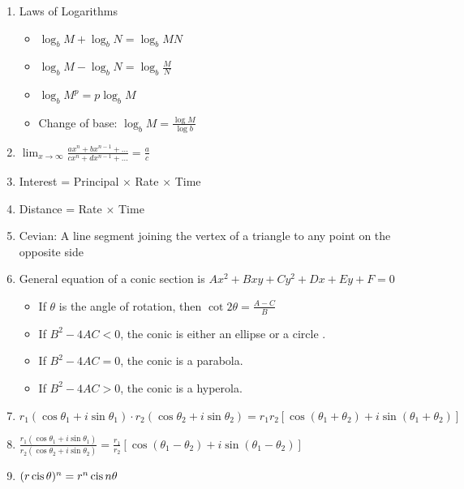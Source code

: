 \documentclass[../uilmath.tex]{subfiles}
\begin{document}
\begin{enumerate}
\begin{itemize}
    \end{itemize}
    \item Laws of Logarithms 
    \begin{itemize}
        \item $\log_b M + \log_b N = \log_b MN$
        \item $\log_b M - \log_b N = \log_b \frac{M}{N}$
        \item $\log_b M^p = p\log_b M$
        \item Change of base: $\log_b M = \frac{\log M}{\log b}$
    \end{itemize}
    \item $\lim_{x\to \infty} \frac{ax^n+bx^{n-1}+\dots}{cx^n+dx^{n-1}+\dots}=\frac{a}{c}$
    \item Interest = Principal $\times$ Rate $\times$ Time 
    \item Distance = Rate $\times$ Time 
    \item Cevian: A line segment joining the vertex of a triangle to any point on the opposite side 
    \item General equation of a conic section is $Ax^2+Bxy+Cy^2+Dx+Ey+F=0$
    \begin{itemize}
        \item If $\theta$ is the angle of rotation, then $\cot 2\theta = \frac{A-C}{B}$
        \item If $B^2-4AC<0$, the conic is either an ellipse or a circle .
        \item If $B^2-4AC=0$, the conic is a parabola.
        \item If $B^2-4AC>0$, the conic is a hyperola.
    \end{itemize}
    \item $r_1(\cos\theta_1 + i\sin\theta_1)\cdot r_2(\cos\theta_2+i\sin\theta_2)=r_1r_2[\cos(\theta_1+\theta_2)+i\sin(\theta_1+\theta_2)]$
    \item $\frac{r_1(\cos\theta_1+i\sin\theta_1)}{r_2(\cos\theta_2+i\sin\theta_2)}=\frac{r_1}{r_2}[\cos(\theta_1-\theta_2)+i\sin(\theta_1-\theta_2)]$
    \item $(r\operatorname{cis} \theta)^n = r^n\operatorname{cis} n\theta$
\end{enumerate}
\end{document}
